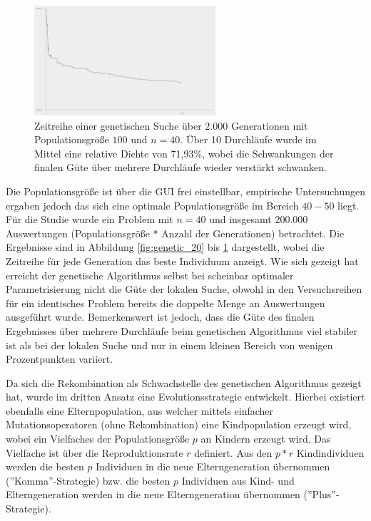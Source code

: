 \documentclass[twoside,bibtotoc]{report}
\begin{document}
\begin{figure}[H]
 \centering
 \includegraphics [width=0.6\textwidth]{Bilder/Genetic_100.png}
 \caption{
 	Zeitreihe einer genetischen Suche über $2.000$ Generationen mit Populationsgröße $100$ und $n = 40$.
 	Über 10 Durchläufe wurde im Mittel eine relative Dichte von 71,93\%, wobei die Schwankungen
 	der finalen Güte über mehrere Durchläufe wieder verstärkt schwanken.
 	}
 \label{fig:genetic_100}
\end{figure}

Die Populationsgröße ist über die \gls{GUI} frei einstellbar, empirische Untersuchungen ergaben jedoch das sich eine optimale Populationsgröße im Bereich $40-50$ liegt. Für die Studie wurde ein Problem mit $n = 40$ und insgesamt $200.000$ Auswertungen (Populationsgröße * Anzahl der Generationen) betrachtet. Die Ergebnisse sind in Abbildung \ref{fig:genetic_20} bis \ref{fig:genetic_100} dargestellt, wobei die Zeitreihe für jede Generation das beste Individuum anzeigt. Wie sich gezeigt hat erreicht der genetische Algorithmus selbst bei scheinbar optimaler Parametrisierung nicht die Güte der lokalen Suche, obwohl in den Versuchsreihen für ein identisches Problem bereits die doppelte Menge an Auswertungen ausgeführt wurde. Bemerkenswert ist jedoch, dass die Güte des finalen Ergebnisses über mehrere Durchläufe beim genetischen Algorithmus viel stabiler ist als bei der lokalen Suche und nur in einem kleinen Bereich von wenigen Prozentpunkten variiert.

\nsecend%

\nsecend%




Da sich die Rekombination als Schwachstelle des genetischen Algorithmus gezeigt hat, wurde im dritten Ansatz eine Evolutionsstrategie entwickelt.
Hierbei existiert ebenfalls eine Elternpopulation, aus welcher mittels einfacher Mutationsoperatoren (ohne Rekombination) eine Kindpopulation erzeugt wird, wobei ein Vielfaches der Populationsgröße $p$ an Kindern erzeugt wird.
Das Vielfache ist über die Reproduktionsrate $r$ definiert.
Aus den $p * r$ Kindindividuen werden die besten $p$ Individuen in die neue Elterngeneration übernommen (''Komma''-Strategie) bzw. die besten $p$ Individuen aus Kind- und Elterngeneration werden in die neue Elterngeneration übernommen (''Plus''-Strategie).\\
\end{document}
